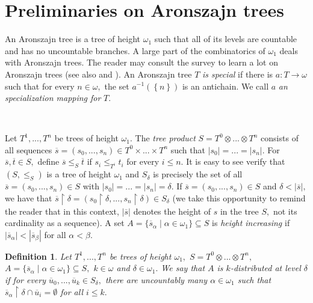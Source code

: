 \documentclass{article}
\newtheorem{definition}[theorem]{Definition}
\begin{document}
\section{Preliminaries on Aronszajn trees}

An Aronszajn tree is a tree of height $\omega_{1}$ such that all of its levels
are countable and has no uncountable branches. A large part of the
combinatorics of $\omega_{1}$ deals with Aronszajn trees. The reader may
consult the survey \cite{StevoHandbook} to learn a lot on Aronszajn trees (see
also \cite{BaumgartnerTesis} and \cite{Kunen}). An Aronszajn tree $T$ \emph{is
special }if there is $a:T\longrightarrow\omega$ such that for every
$n\in\omega,$ the set $a^{-1}\left(  \left\{  n\right\}  \right)  $ is an
antichain. We call $a$ \emph{an specialization mapping for }$T.$

\qquad\qquad\qquad\ \ \ \ 

Let $T^{1},...,T^{n}$ be trees of height $\omega_{1}.$ The \emph{tree product
}$S=T^{0}\otimes...\otimes T^{n}$ consists of all sequences $\overline
{s}=\left(  s_{0},...,s_{n}\right)  \in T^{0}\times...\times T^{n}$ such that
$\left\vert s_{0}\right\vert =...=\left\vert s_{n}\right\vert .$ For
$\overline{s},\overline{t}\in S,$ define $\overline{s}\leq_{S}\overline{t}$ if
$s_{i}\leq_{T^{i}}t_{i}$ for every $i\leq n.$ It is easy to see verify that
$\left(  S,\leq_{S}\right)  $ is a tree of height $\omega_{1}$ and $S_{\delta
}$ is precisely the set of all $\overline{s}=\left(  s_{0},...,s_{n}\right)
\in S$ with $\left\vert s_{0}\right\vert =...=\left\vert s_{n}\right\vert
=\delta.$ If $\overline{s}=\left(  s_{0},...,s_{n}\right)  \in S$ and
$\delta<\left\vert \overline{s}\right\vert ,$ we have that $\overline
{s}\upharpoonright\delta=\left(  s_{0}\upharpoonright\delta,...,s_{n}%
\upharpoonright\delta\right)  \in S_{\delta}$ (we take this opportunity to
remind the reader that in this context, $\left\vert \overline{s}\right\vert $
denotes the height of $s$ in the tree $S,$ not its cardinality as a sequence).
A set $A=\{\overline{s}_{\alpha}\mid\alpha\in\omega_{1}\}\subseteq S$ is
\emph{height increasing }if $\left\vert \overline{s}_{\alpha}\right\vert
<\left\vert \overline{s}_{\beta}\right\vert $ for all $\alpha<\beta$.

\begin{definition}
Let $T^{1},...,T^{n}$ be trees of height $\omega_{1},$ $S=T^{0}\otimes
...\otimes T^{n},$ $A=\{\overline{s}_{\alpha}\mid\alpha\in\omega
_{1}\}\subseteq S,$ $k\in\omega$ and $\delta\in\omega_{1}.$ We say that $A$
\emph{is }$k$\emph{-distributed at level} $\delta$ if for every $\overline
{u}_{0},...,\overline{u}_{k}\in S_{\delta},$ there are uncountably many
$\alpha\in\omega_{1}$ such that $\overline{s}_{\alpha}\upharpoonright
\delta\cap\overline{u}_{i}=\emptyset$ for all $i\leq k.$
\end{definition}
\end{document}
